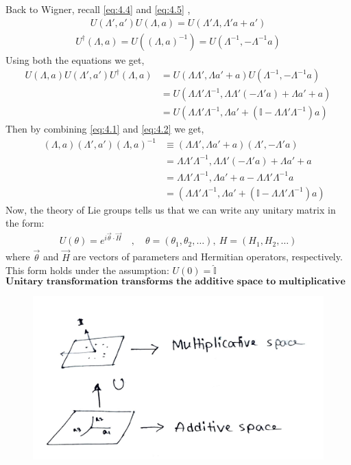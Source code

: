\documentclass[14pt]{article} %
\begin{document}
\noindent
Back to Wigner, recall \eqref{eq:4.4} and \eqref{eq:4.5} ,
\begin{align*}
U(\Lambda', a')U(\Lambda, a) = U(\Lambda'\Lambda,\Lambda' a + a') \tag{4.4}
\end{align*}
\begin{align*}
U^\dagger(\Lambda,a)=U\left((\Lambda,a)^{-1}\right)=U(\Lambda^{-1},-\Lambda^{-1}a)  \tag{4.5}
\end{align*}
Using both the equations we get,
\begin{align*}
U(\Lambda, a) U(\Lambda', a') U^\dagger(\Lambda, a)
&= U(\Lambda \Lambda', \Lambda a' + a) U(\Lambda^{-1}, -\Lambda^{-1} a) \\
&= U(\Lambda \Lambda' \Lambda^{-1}, \Lambda \Lambda' (-\Lambda' a) + \Lambda a' + a) \\
&= U(\Lambda \Lambda' \Lambda^{-1}, \Lambda a' + (\mathbb{I} - \Lambda \Lambda' \Lambda^{-1}) a) \tag{4.6} \label{4.6}
\end{align*}
Then by combining \eqref{eq:4.1} and \eqref{eq:4.2} we get,
\begin{align*}
\quad~(\Lambda, a) (\Lambda', a') (\Lambda, a)^{-1} 
&\equiv (\Lambda \Lambda', \Lambda a' + a) (\Lambda', -\Lambda' a) \\
&= \Lambda \Lambda' \Lambda^{-1}, \Lambda \Lambda' (-\Lambda' a) + \Lambda a' + a \\
&= \Lambda \Lambda' \Lambda^{-1}, \Lambda a' +a - \Lambda \Lambda' \Lambda^{-1} a \\
&= \left( \Lambda \Lambda' \Lambda^{-1}, \Lambda a' + (\mathbb{I} - \Lambda \Lambda' \Lambda^{-1}) a \right) \tag{4.7} \label{4.7}
\end{align*}
Now, the theory of Lie groups tells us that we can write any unitary matrix in the form:
\begin{align*}
U(\theta) = e^{ i \vec{\theta}\cdot \vec{H} } \quad, \quad \theta=(\theta_1, \theta_2, \dots),\ H=(H_1, H_2, \dots)
\end{align*}
where $\vec{\theta}$ and $\vec{H}$ are vectors of parameters and Hermitian operators, respectively.  
This form holds under the assumption: $U(0) = \hat{\mathbb{I}}$
$$ \boxed{\textbf{Unitary transformation transforms the additive space to multiplicative space.}} $$
\begin{figure}[H]
\centering
\includegraphics[width=0.7\linewidth]{L1_2.jpg}
\caption*{}
\end{figure}
\end{document}

